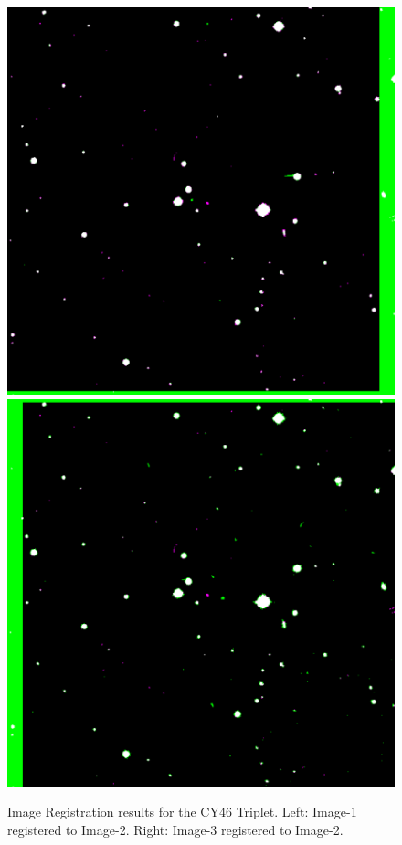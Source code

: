\begin{figure}[b]
  \includegraphics[width=\linewidth]{Figures/NEATImageReg12.pdf}
\endminipage\hfill
{}
  \includegraphics[width=\linewidth]{Figures/NEATImageReg32.pdf}
\endminipage\hfill
\caption{Image Registration results for the CY46 Triplet.  Left: Image-1 registered to Image-2. Right: Image-3 registered to Image-2.}
\label{fig:NEAT_Registration}
\end{figure}

